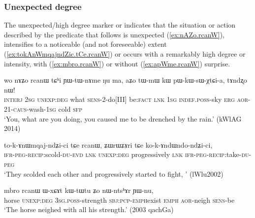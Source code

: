 
\subsubsection{Unexpected degree} \label{sec:unexpected} 
The unexpected/high degree marker  or  indicates that the situation or action described by the predicate that follows is unexpected (\ref{ex:nAZo.rcanW}), intensifies to a noticeable (and not foreseeable) extent (\ref{ex:tokAnWmqajndZic.tCe.rcanW}) or occurs with a remarkably high degree or intensity, with  (\ref{ex:mbro.rcanW}) or without (\ref{ex:apWme.rcanW}) surprise.


\begin{exe}
	\ex \label{ex:nAZo.rcanW}
	\gll  wo nɤʑo rcanɯ tɕʰi ɲɯ-tɯ-nɤme ŋu ma,  aʑo tɯ-mɯ kɯ pɯ-kɯ-sɯ-χtɕi-a, tɤndʐo nɯ! \\
	\textsc{interj} \textsc{2sg} \textsc{unexp}:\textsc{deg} what \textsc{sens}-2-do[III] be:\textsc{fact} \textsc{lnk} \textsc{1sg} \textsc{indef}.\textsc{poss}-sky \textsc{erg} \textsc{aor}-2\fl{}1-\textsc{caus}-wash-\textsc{1sg} cold \textsc{sfp} \\
	\glt `You, what are you doing, you caused me to be drenched by the rain.' (kWlAG 2014) \\
\end{exe}

\begin{exe}
	\ex \label{ex:tokAnWmqajndZic.tCe.rcanW}
	\gll to-k-ɤnɯmqaj-ndʑi-ci tɕe rcanɯ, ʑɯrɯʑɤri tɕe ko-k-ɤndɯndo-ndʑi-ci, \\
	\textsc{ifr}-\textsc{peg}-\textsc{recip}:scold-\textsc{du}-\textsc{evd} \textsc{lnk}  \textsc{unexp}:\textsc{deg} progressively \textsc{lnk}   \textsc{ifr}-\textsc{peg}-\textsc{recip}:take-\textsc{du}-\textsc{peg} \\
	\glt `They scolded each other and progressively started to fight, ' (lWlu2002)
\end{exe}

\begin{exe}
	\ex \label{ex:mbro.rcanW}
	\gll mbro rcanɯ ɯ-xɕɤt kɯ-tɯ\redp{}tu ʑo nɯ-ntsʰɤr ɲɯ-nu, \\
	horse \textsc{unexp}:\textsc{deg} \textsc{3sg}.\textsc{poss}-strength \textsc{sbj}:\textsc{pcp}-\textsc{emph}\redp{}exist \textsc{emph} \textsc{aor}-neigh \textsc{sens}-be \\ 
	\glt `The horse neighed with all his strength.' (2003 qachGa)
\end{exe}

